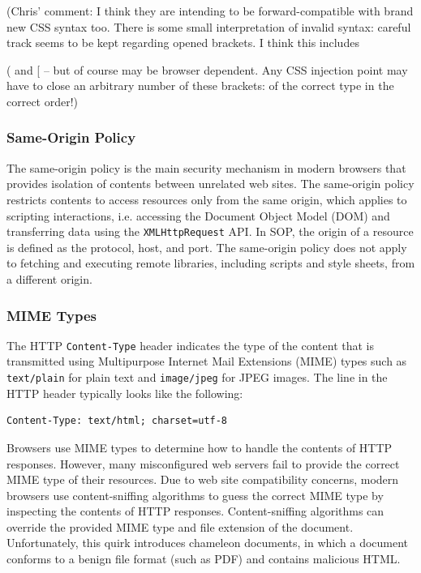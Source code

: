 \documentclass{acm_proc_article-sp}
\begin{document}
(Chris' comment: I think they are intending to be forward-compatible with brand new CSS syntax too.
There is some small interpretation of invalid syntax: careful track seems to be kept regarding opened brackets. I think this includes { ( and [ -- but of course may be browser dependent. Any CSS injection point may have to close an arbitrary number of these brackets: of the correct type in the correct order!)

\subsubsection{Same-Origin Policy}
The same-origin policy\cite{mozillasameorigin} is the main security mechanism in modern browsers that provides isolation of contents between unrelated web sites. The same-origin policy restricts contents to access resources only from the same origin, which applies to scripting interactions, i.e. accessing the Document Object Model (DOM)\cite{dom} and transferring data using the \texttt{XMLHttpRequest} API. In SOP, the origin of a resource is defined as the protocol, host, and port. The same-origin policy does not apply to fetching and executing remote libraries, including scripts and style sheets, from a different origin.

\subsubsection{MIME Types}
The HTTP \texttt{Content-Type} header indicates the type of the content that is transmitted using Multipurpose Internet Mail Extensions (MIME)\cite{mime} types such as \texttt{text/plain} for plain text and \texttt{image/jpeg} for JPEG images. The line in the HTTP header typically looks like the following:
\begin{verbatim}
Content-Type: text/html; charset=utf-8
\end{verbatim}
Browsers use MIME types to determine how to handle the contents of HTTP responses. However, many misconfigured web servers fail to provide the correct MIME type of their resources. Due to web site compatibility concerns, modern browsers use content-sniffing algorithms\cite{securecontentsniffing} to guess the correct MIME type by inspecting the contents of HTTP responses.  Content-sniffing algorithms can override the provided MIME type and file extension of the document. Unfortunately, this quirk introduces chameleon documents, in which a document conforms to a benign file format (such as PDF) and contains malicious HTML.

}
\end{document}
